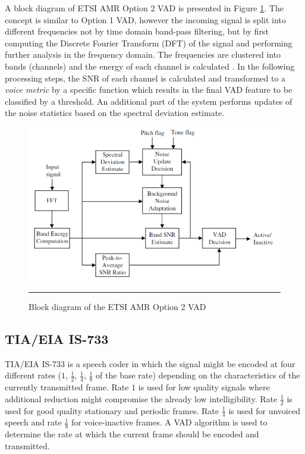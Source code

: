 A block diagram of ETSI AMR Option 2 VAD is presented in Figure \ref{fig:AMR2}. The concept is similar to Option 1 VAD, however the incoming signal is split into different frequencies not by time domain band-pass filtering, but by first computing the Discrete Fourier Transform (DFT) of the signal and performing further analysis in the frequency domain. The frequencies are clustered into bands (channels) and the energy of each channel is calculated \citep{Cornu}. In the following processing steps, the SNR of each channel is calculated and transformed to a \emph{voice metric} by a specific function which results in the final VAD feature to be classified by a threshold. An additional part of the system performs updates of the noise statistics based on the spectral deviation estimate.

\begin{figure}[htbp]
	\centering
		\includegraphics[width=0.9\columnwidth]{Figures/Chapter2/AMR2.png}
		\rule{37em}{0.5pt}
	\caption[Block diagram of the ETSI AMR Option 2 VAD]{Block diagram of the ETSI AMR Option 2 VAD \cite{Kondoz}}
	\label{fig:AMR2}
\end{figure}

\subsection{TIA/EIA IS-733}

TIA/EIA IS-733 is a speech coder in which the signal might be encoded at four different rates ($1$, $\frac{1}{2}$, $\frac{1}{4}$, $\frac{1}{8}$ of the base rate) depending on the characteristics of the currently transmitted frame. Rate $1$ is used for low quality signals where additional reduction might compromise the already low intelligibility. Rate $\frac{1}{2}$ is used for good quality stationary and periodic frames. Rate $\frac{1}{4}$ is used for unvoiced speech and rate $\frac{1}{8}$ for voice-inactive frames. A VAD algorithm is used to determine the rate at which the current frame should be encoded and transmitted.

